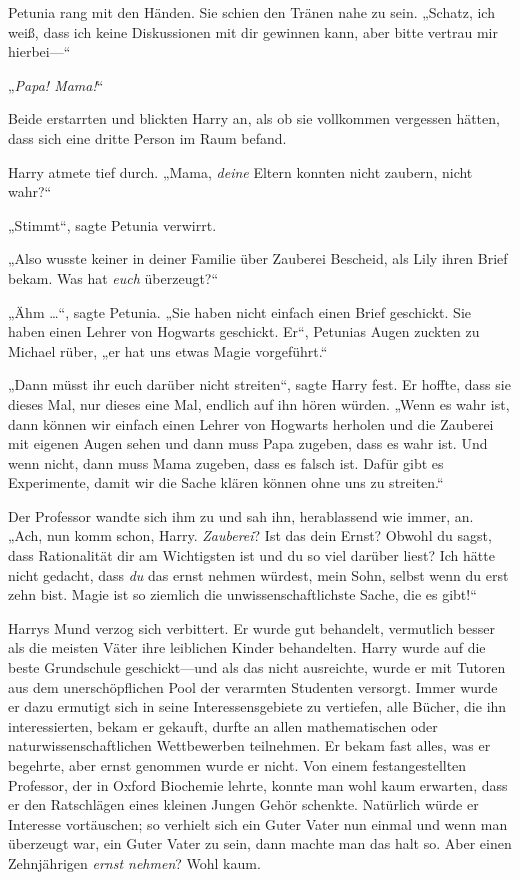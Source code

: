 {Petunia rang mit den Händen. Sie schien den Tränen nahe zu sein. „Schatz, ich weiß, dass ich keine Diskussionen mit dir gewinnen kann, aber bitte vertrau mir hierbei—“

„\emph{Papa! Mama!}“

Beide erstarrten und blickten Harry an, als ob sie vollkommen vergessen hätten, dass sich eine dritte Person im Raum befand.

Harry atmete tief durch. „Mama, \emph{deine} Eltern konnten nicht zaubern, nicht wahr?“

„Stimmt“, sagte Petunia verwirrt.

„Also wusste keiner in deiner Familie über Zauberei Bescheid, als Lily ihren Brief bekam. Was hat \emph{euch} überzeugt?“

„Ähm …“, sagte Petunia. „Sie haben nicht einfach einen Brief geschickt. Sie haben einen Lehrer von Hogwarts geschickt. Er“, Petunias Augen zuckten zu Michael rüber, „er hat uns etwas Magie vorgeführt.“

„Dann müsst ihr euch darüber nicht streiten“, sagte Harry fest. Er hoffte, dass sie dieses Mal, nur dieses eine Mal, endlich auf ihn hören würden. „Wenn es wahr ist, dann können wir einfach einen Lehrer von Hogwarts herholen und die Zauberei mit eigenen Augen sehen und dann muss Papa zugeben, dass es wahr ist. Und wenn nicht, dann muss Mama zugeben, dass es falsch ist. Dafür gibt es Experimente, damit wir die Sache klären können ohne uns zu streiten.“

Der Professor wandte sich ihm zu und sah ihn, herablassend wie immer, an. „Ach, nun komm schon, Harry. \emph{Zauberei}? Ist das dein Ernst? Obwohl du sagst, dass Rationalität dir am Wichtigsten ist und du so viel darüber liest? Ich hätte nicht gedacht, dass \emph{du} das ernst nehmen würdest, mein Sohn, selbst wenn du erst zehn bist. Magie ist so ziemlich die unwissenschaftlichste Sache, die es gibt!“

Harrys Mund verzog sich verbittert. Er wurde gut behandelt, vermutlich besser als die meisten Väter ihre leiblichen Kinder behandelten. Harry wurde auf die beste Grundschule geschickt—und als das nicht ausreichte, wurde er mit Tutoren aus dem unerschöpflichen Pool der verarmten Studenten versorgt. Immer wurde er dazu ermutigt sich in seine Interessensgebiete zu vertiefen, alle Bücher, die ihn interessierten, bekam er gekauft, durfte an allen mathematischen oder naturwissenschaftlichen Wettbewerben teilnehmen. Er bekam fast alles, was er begehrte, aber ernst genommen wurde er nicht. Von einem festangestellten Professor, der in Oxford Biochemie lehrte, konnte man wohl kaum erwarten, dass er den Ratschlägen eines kleinen Jungen Gehör schenkte. Natürlich würde er Interesse vortäuschen; so verhielt sich ein Guter Vater nun einmal und wenn man überzeugt war, ein Guter Vater zu sein, dann machte man das halt so. Aber einen Zehnjährigen \emph{ernst nehmen}? Wohl kaum.

}
